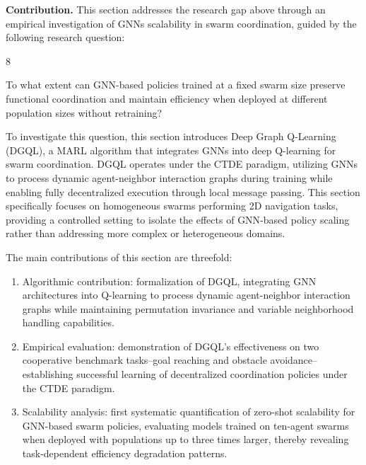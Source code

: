 \textbf{Contribution.}
This section addresses the research gap above through an empirical investigation 
 of \glspl{GNN} scalability in swarm coordination, 
 guided by the following research question:

\begin{chapRQ}{8}
  \item
  To what extent can \gls{GNN}-based policies trained at a fixed swarm size
  preserve functional coordination and maintain efficiency when deployed
  at different population sizes without retraining?
  \label{rq:dgql}
\end{chapRQ}

%
To investigate this question, 
 this section introduces Deep Graph Q-Learning (DGQL), 
 a \gls{MARL} algorithm that integrates \glspl{GNN} into deep Q-learning for swarm coordination. 
%
DGQL operates under the CTDE paradigm, 
 utilizing \glspl{GNN} to process dynamic agent-neighbor interaction graphs during training 
 while enabling fully decentralized execution through local message passing.
%
This section specifically focuses on homogeneous swarms performing 2D navigation tasks,
 providing a controlled setting to isolate the effects of \gls{GNN}-based policy scaling 
 rather than addressing more complex or heterogeneous domains.

The main contributions of this section are threefold:

\begin{enumerate}
    \item Algorithmic contribution: 
    formalization of DGQL, integrating \gls{GNN} architectures into Q-learning 
    to process dynamic agent-neighbor interaction graphs 
    while maintaining permutation invariance and variable neighborhood handling capabilities.
    
    \item Empirical evaluation: 
    demonstration of DGQL's effectiveness on two cooperative benchmark tasks--goal 
    reaching and obstacle avoidance--establishing successful learning 
    of decentralized coordination policies under the CTDE paradigm.
    
    \item Scalability analysis: 
    first systematic quantification of zero-shot scalability for GNN-based swarm policies, 
    evaluating models trained on ten-agent swarms when deployed with populations 
    up to three times larger, thereby revealing task-dependent efficiency degradation patterns.
\end{enumerate}


